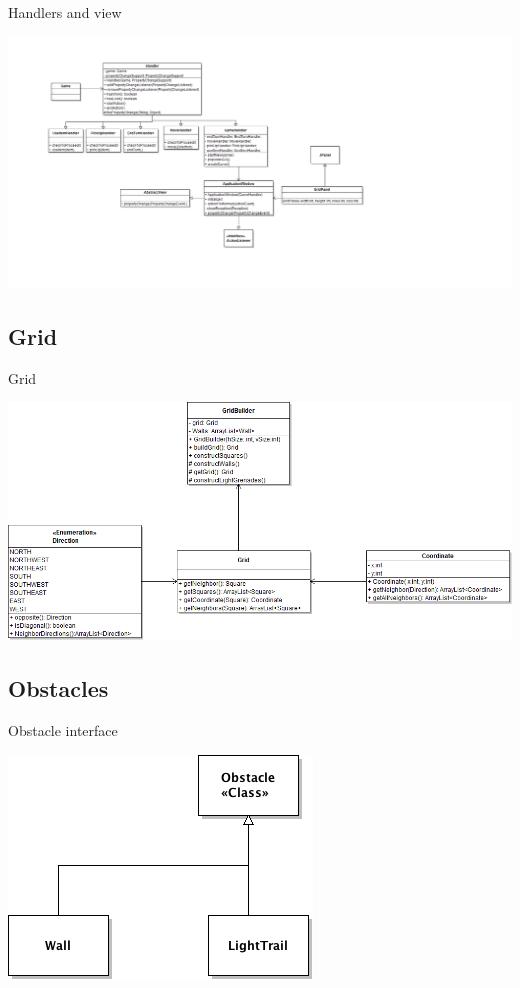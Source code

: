 \documentclass[t]{beamer}
\begin{document}
\begin{frame}{Handlers and view}
\begin{center}
\includegraphics[width=\linewidth]{images/Handlers-View}
\end{center}
\end{frame}

\subsection{Grid}
\begin{frame}{Grid}
\begin{center}
\includegraphics[width=\linewidth]{images/GridClass}
\end{center}
\end{frame}


\subsection{Obstacles}
\begin{frame}{Obstacle interface}
\begin{center}
\includegraphics[width=0.50\linewidth]{images/obstacleinterface}
\end{center}
\end{frame}
\end{document}
